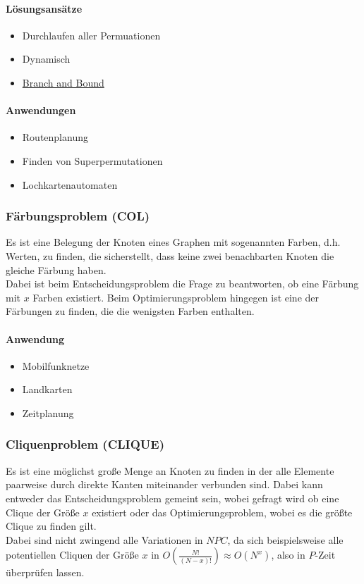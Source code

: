\documentclass{article}
\begin{document}
\paragraph*{Lösungsansätze}
\begin{itemize}
    \item Durchlaufen aller Permuationen
    \item Dynamisch
    \item \href{https://github.com/miltfra/tsp}{Branch and Bound}
\end{itemize}
\paragraph*{Anwendungen}
\begin{itemize}
    \item Routenplanung
    \item Finden von Superpermutationen
    \item Lochkartenautomaten
\end{itemize}
\subsubsection{Färbungsproblem (COL)}
Es ist eine Belegung der Knoten eines Graphen mit sogenannten Farben, d.h. Werten, zu finden, die sicherstellt, dass keine zwei benachbarten Knoten die gleiche Färbung haben. \\
\indent Dabei ist beim Entscheidungsproblem die Frage zu beantworten, ob eine Färbung mit $x$ Farben existiert. Beim Optimierungsproblem hingegen ist eine der Färbungen zu finden, die die wenigsten Farben enthalten.
\paragraph*{Anwendung}
\begin{itemize}
    \item Mobilfunknetze
    \item Landkarten
    \item Zeitplanung
\end{itemize}
\subsubsection{Cliquenproblem (CLIQUE)}
Es ist eine möglichst große Menge an Knoten zu finden in der alle Elemente paarweise durch direkte Kanten miteinander verbunden sind. Dabei kann entweder das Entscheidungsproblem gemeint sein, wobei gefragt wird ob eine Clique der Größe $x$ existiert oder das Optimierungsproblem, wobei es die größte Clique zu finden gilt.\\
\indent Dabei sind nicht zwingend alle Variationen in $NPC$, da sich beispielsweise alle potentiellen Cliquen der Größe $x$ in $O(\frac{N!}{(N-x)!})\approx O(N^x)$, also in $P$-Zeit überprüfen lassen.
\end{document}
